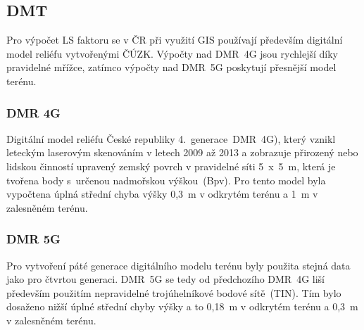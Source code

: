 \subsection{DMT}
Pro výpočet LS faktoru se v ČR při využití GIS používají především
digitální model reliéfu vytvořenými ČÚZK\cite{cuzk}. Výpočty nad
DMR~4G jsou rychlejší díky pravidelné mřížce, zatímco výpočty nad
DMR~5G poskytují přesnější model terénu.
\subsubsection{DMR 4G}
Digitální model reliéfu České republiky 4.~generace~DMR~4G), který
vznikl leteckým laserovým skenováním v letech 2009 až 2013 a zobrazuje
přirozený nebo lidskou činností upravený zemský povrch v pravidelné
síti 5~x~5~m, která je tvořena body s~určenou nadmořskou
výškou~(Bpv). Pro tento model byla vypočtena úplná střední chyba výšky
0,3~m v odkrytém terénu a 1~m v zalesněném terénu.
\subsubsection{DMR 5G}
Pro vytvoření páté generace digitálního modelu terénu byly použita
stejná data jako pro čtvrtou generaci. DMR~5G se tedy od předchozího
DMR~4G liší především použitím nepravidelné trojúhelníkové bodové
sítě~(TIN). Tím bylo dosaženo nižší úplné střední chyby výšky a to
0,18~m v odkrytém terénu a 0,3~m v zalesněném terénu.
